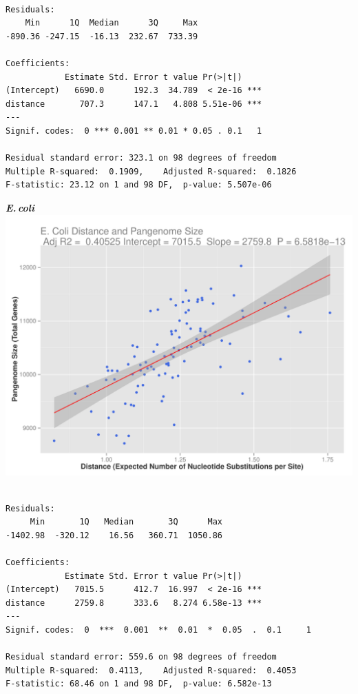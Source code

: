 \documentclass[12pt]{article}
\newcommand{\ecol}{\textit{E.\,coli}\xspace}
\begin{document}
\begin{lstlisting}

Residuals:
    Min      1Q  Median      3Q     Max 
-890.36 -247.15  -16.13  232.67  733.39 

Coefficients:
            Estimate Std. Error t value Pr(>|t|)    
(Intercept)   6690.0      192.3  34.789  < 2e-16 ***
distance       707.3      147.1   4.808 5.51e-06 ***
---
Signif. codes:  0 *** 0.001 ** 0.01 * 0.05 . 0.1   1

Residual standard error: 323.1 on 98 degrees of freedom
Multiple R-squared:  0.1909,    Adjusted R-squared:  0.1826 
F-statistic: 23.12 on 1 and 98 DF,  p-value: 5.507e-06

\end{lstlisting}


\newpage 

{\large \textbf{\ecol}\\}
\includegraphics[width=\textwidth]{ecoliplotlr.pdf}

\begin{lstlisting}

Residuals:
     Min       1Q   Median       3Q      Max 
-1402.98  -320.12    16.56   360.71  1050.86 

Coefficients:
            Estimate Std. Error t value Pr(>|t|)    
(Intercept)   7015.5      412.7  16.997  < 2e-16 ***
distance      2759.8      333.6   8.274 6.58e-13 ***
---
Signif. codes:  0  ***  0.001  **  0.01  *  0.05  .  0.1     1

Residual standard error: 559.6 on 98 degrees of freedom
Multiple R-squared:  0.4113,    Adjusted R-squared:  0.4053 
F-statistic: 68.46 on 1 and 98 DF,  p-value: 6.582e-13

\end{lstlisting}
\end{document}
